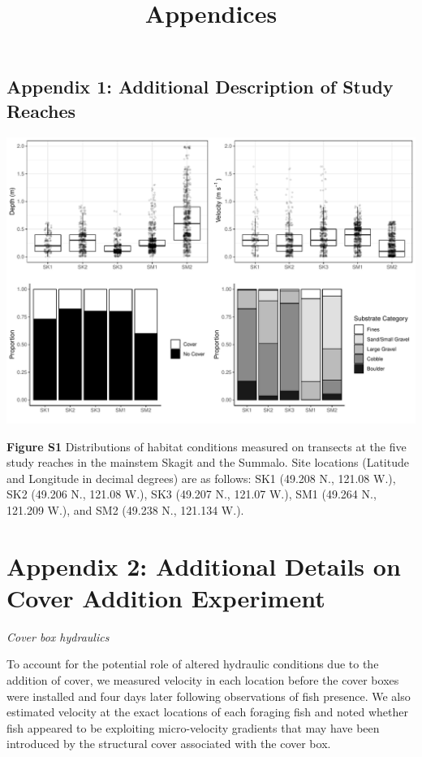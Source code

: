 \documentclass[]{article}
\title{Appendices}
\author{}
\date{\vspace{-2.5em}}
\begin{document}
\maketitle

\subsection{Appendix 1: Additional Description of Study
Reaches}\label{appendix-1-additional-description-of-study-reaches}

\includegraphics{Final_figures/Appendix_S1}

\textbf{Figure S1} Distributions of habitat conditions measured on
transects at the five study reaches in the mainstem Skagit and the
Summalo. Site locations (Latitude and Longitude in decimal degrees) are
as follows: SK1 (49.208 N., 121.08 W.), SK2 (49.206 N., 121.08 W.), SK3
(49.207 N., 121.07 W.), SM1 (49.264 N., 121.209 W.), and SM2 (49.238 N.,
121.134 W.).

\clearpage

\section{Appendix 2: Additional Details on Cover Addition
Experiment}\label{appendix-2-additional-details-on-cover-addition-experiment}

\emph{Cover box hydraulics}

To account for the potential role of altered hydraulic conditions due to
the addition of cover, we measured velocity in each location before the
cover boxes were installed and four days later following observations of
fish presence. We also estimated velocity at the exact locations of each
foraging fish and noted whether fish appeared to be exploiting
micro-velocity gradients that may have been introduced by the structural
cover associated with the cover box.
\end{document}
